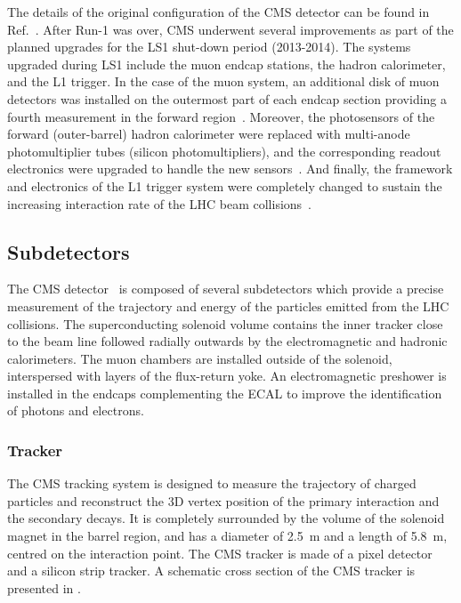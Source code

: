 The details of the original configuration of the CMS detector can be found in Ref.~\cite{CMS}. After Run-1 was over, CMS underwent several improvements as part of the planned upgrades for the LS1 shut-down period (2013-2014). The systems upgraded during LS1 include the muon endcap stations, the hadron calorimeter, and the L1 trigger. In the case of the muon system, an additional disk of muon detectors was installed on the outermost part of each endcap section providing a fourth measurement in the forward region~\cite{CMSMuonUpgrade}. Moreover, the photosensors of the forward (outer-barrel) hadron calorimeter were replaced with multi-anode photomultiplier tubes (silicon photomultipliers), and the corresponding readout electronics were upgraded to handle the new sensors~\cite{CMSHCALUpgrade}. And finally, the framework and electronics of the L1 trigger system were completely changed to sustain the increasing interaction rate of the LHC beam collisions~\cite{L1_Stage2}.


\subsection{Subdetectors}\label{sec:Experiment_CMS_Subdetectors}

The CMS detector~\cite{CMS} is composed of several subdetectors which provide a precise measurement of the trajectory and energy of the particles emitted from the LHC collisions. The superconducting solenoid volume contains the inner tracker close to the beam line followed radially outwards by the electromagnetic and hadronic calorimeters. The muon chambers are installed outside of the solenoid, interspersed with layers of the flux-return yoke. An electromagnetic preshower is installed in the endcaps complementing the ECAL to improve the identification of photons and electrons.


\subsubsection{Tracker}\label{sec:Experiment_CMS_Subdetectors_Tracker}

The CMS tracking system is designed to measure the trajectory of charged particles and reconstruct the 3D vertex position of the primary interaction and the secondary decays. It is completely surrounded by the volume of the solenoid magnet in the barrel region, and has a diameter of \SI{2.5}{\m} and a length of \SI{5.8}{\m}, centred on the interaction point. The CMS tracker is made of a pixel detector and a silicon strip tracker. A schematic cross section of the CMS tracker is presented in .


